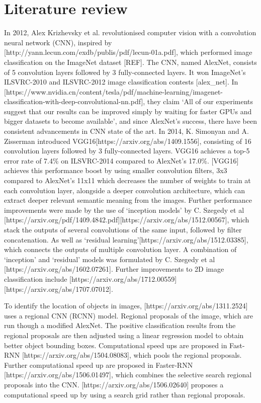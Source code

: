 \documentclass[11pt]{article}
\begin{document}
\section{Literature review}
In 2012, Alex Krizhevsky et al. revolutionised computer vision with a convolution neural network (CNN), inspired by [http://yann.lecun.com/exdb/publis/pdf/lecun-01a.pdf], which performed image classification on the ImageNet dataset [REF]. The CNN, named AlexNet, consists of 5 convolution layers followed by 3 fully-connected layers. It won ImageNet's ILSVRC-2010 and ILSVRC-2012 image classification contests [alex_net]. In [https://www.nvidia.cn/content/tesla/pdf/machine-learning/imagenet-classification-with-deep-convolutional-nn.pdf], they claim `All of our experiments suggest that our results can be improved simply by waiting for faster GPUs and bigger datasets to become available', and since AlexNet's success, there have been consistent advancements in CNN state of the art. In 2014, K. Simonyan and A. Zisserman introduced VGG16[https://arxiv.org/abs/1409.1556], consisting of 16 convolution layers followed by 3 fully-connected layers. VGG16 achieves a top-5 error rate of 7.4\% on ILSVRC-2014 compared to AlexNet's 17.0\%. [VGG16] achieves this performance boost by using smaller convolution filters, 3x3 compared to AlexNet's 11x11 which decreases the number of weights to train at each convolution layer, alongside a deeper convolution architecture, which can extract deeper relevant semantic meaning from the images. Further performance improvements were made by the use of `inception models' by C. Szegedy et al [https://arxiv.org/pdf/1409.4842.pdf][https://arxiv.org/abs/1512.00567], which stack the outputs of several convolutions of the same input, followed by filter concatenation. As well as `residual learning'[https://arxiv.org/abs/1512.03385], which connects the outputs of multiple convolution layer. A combination of `inception' and `residual' models was formulated by C. Szegedy et al [https://arxiv.org/abs/1602.07261]. Further improvements to 2D image classification include [https://arxiv.org/abs/1712.00559] [https://arxiv.org/abs/1707.07012].

To identify the location of objects in images, [https://arxiv.org/abs/1311.2524] uses a regional CNN (RCNN) model. Regional proposals of the image, which are run though a modified AlexNet. The positive classification results from the regional proposals are then adjusted using a linear regression model to obtain better object bounding boxes. Computational speed ups are proposed in Fast-RNN [https://arxiv.org/abs/1504.08083], which pools the regional proposals. Further computational speed up are proposed in Faster-RNN [https://arxiv.org/abs/1506.01497], which combines the selective search regional proposals into the CNN. [https://arxiv.org/abs/1506.02640] proposes a computational speed up by using a search grid rather than regional proposals.
\end{document}

